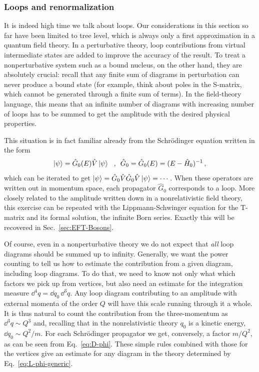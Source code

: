 \subsubsection{Loops and renormalization}
\label{sec:Loops}

It is indeed high time we talk about loops.  Our considerations in this section 
so far have been limited to tree level, which is always only a first 
approximation in a quantum field theory.  In a perturbative theory, loop 
contributions from virtual intermediate states are added to improve the 
accuracy of the result.  To treat a nonperturbative system such as a bound 
nucleus, on the other hand, they are absolutely crucial: recall that any finite 
sum of diagrams in perturbation can never produce a bound state (for example, 
think about poles in the S-matrix, which cannot be generated through a finite 
sum of terms).  In the field-theory language, this means that an infinite 
number of diagrams with increasing number of loops has to be summed to get the 
amplitude with the desired physical properties.

This situation is in fact familiar already from the Schr\"odinger equation 
written in the form
%
\begin{equation}
 \ket{\psi} = \hat{G}_0(E) \hat{V} \ket{\psi} \ \ \text{,}\ \ 
 \hat{G}_0 = \hat{G}_0(E) = (E - \hat{H}_0)^{-1} \,,
\end{equation}
%
which can be iterated to get $\ket{\psi} = \hat{G}_0\hat{V}
\hat{G}_0\hat{V} \ket{\psi} = \cdots$.  When these operators are written 
out in momentum space, each propagator $\hat{G}_0$ corresponds to a loop.
More closely related to the amplitude written down in a nonrelativistic field 
theory, this exercise can be repeated with the Lippmann-Schwinger equation for 
the T-matrix and its formal solution, the infinite Born series.  Exactly this 
will be recovered in Sec.~\ref{sec:EFT-Bosons}.

Of course, even in a nonperturbative theory we do not expect that \emph{all} 
loop diagrams should be summed up to infinity.  Generally, we want the power 
counting to tell us how to estimate the contribution from a given diagram, 
including loop diagrams.  To do that, we need to know not only what which 
factors we pick up from vertices, but also need an estimate for the integration 
measure $\dd^4q = \dd q_0\,\dd^3 q$.  Any loop diagram contributing to an 
amplitude with external momenta of the order $Q$ will have this scale running 
through it a whole.  It is thus natural to count the contribution from the 
three-momentum as $\dd^3 q \sim Q^3$ and, recalling that in the nonrelativistic 
theory $q_0$ is a kinetic energy, $\dd q_0 \sim Q^2/m$.  For each Schr\"odinger 
propagator we get, conversely, a factor $m/Q^2$, as can be seen from 
Eq.~\eqref{eq:D-phi}.  These simple rules combined with those for the vertices 
give an estimate for any diagram in the theory determined by 
Eq.~\eqref{eq:L-phi-generic}.

